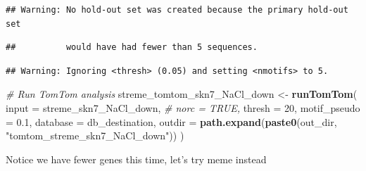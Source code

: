 \documentclass[
]{book}
\newenvironment{Shaded}{\begin{snugshade}}{\end{snugshade}}
\newcommand{\AttributeTok}[1]{\textcolor[rgb]{0.13,0.29,0.53}{#1}}
\newcommand{\CommentTok}[1]{\textcolor[rgb]{0.56,0.35,0.01}{\textit{#1}}}
\newcommand{\DecValTok}[1]{\textcolor[rgb]{0.00,0.00,0.81}{#1}}
\newcommand{\FloatTok}[1]{\textcolor[rgb]{0.00,0.00,0.81}{#1}}
\newcommand{\FunctionTok}[1]{\textcolor[rgb]{0.13,0.29,0.53}{\textbf{#1}}}
\newcommand{\NormalTok}[1]{#1}
\newcommand{\OtherTok}[1]{\textcolor[rgb]{0.56,0.35,0.01}{#1}}
\newcommand{\StringTok}[1]{\textcolor[rgb]{0.31,0.60,0.02}{#1}}
\begin{document}
\begin{verbatim}
## Warning: No hold-out set was created because the primary hold-out set
\end{verbatim}

\begin{verbatim}
##          would have had fewer than 5 sequences.
\end{verbatim}

\begin{verbatim}
## Warning: Ignoring <thresh> (0.05) and setting <nmotifs> to 5.
\end{verbatim}

\begin{Shaded}
\begin{Highlighting}[]
\CommentTok{\# Run TomTom analysis}
\NormalTok{streme\_tomtom\_skn7\_NaCl\_down }\OtherTok{\textless{}{-}} \FunctionTok{runTomTom}\NormalTok{(}
  \AttributeTok{input =}\NormalTok{ streme\_skn7\_NaCl\_down,}
  \CommentTok{\# norc = TRUE,}
  \AttributeTok{thresh =} \DecValTok{20}\NormalTok{,}
  \AttributeTok{motif\_pseudo =} \FloatTok{0.1}\NormalTok{,}
  \AttributeTok{database =}\NormalTok{ db\_destination,}
  \AttributeTok{outdir =} \FunctionTok{path.expand}\NormalTok{(}\FunctionTok{paste0}\NormalTok{(out\_dir, }\StringTok{"tomtom\_streme\_skn7\_NaCl\_down"}\NormalTok{))}
\NormalTok{  )}
\end{Highlighting}
\end{Shaded}

Notice we have fewer genes this time, let's try meme instead
\end{document}
